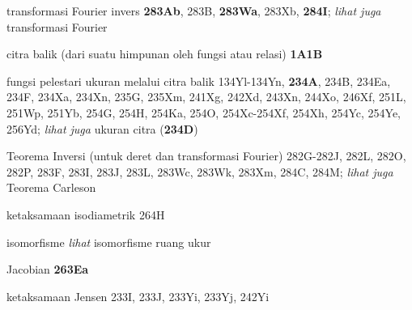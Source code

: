  




transformasi Fourier invers {\bf 283Ab}, 283B, {\bf 283Wa}, 283Xb,
{\bf 284I};
  {\it lihat juga} transformasi Fourier


citra balik (dari suatu himpunan oleh fungsi atau relasi) {\bf 1A1B}


fungsi pelestari ukuran melalui citra balik
134Yl-134Yn, 
  {\bf 234A}, 234B, 234Ea, 234F, 234Xa, 234Xn, 235G, 235Xm, 241Xg,
242Xd, 243Xn, 244Xo, 246Xf, 251L, 251Wp, 251Yb,
254G, 254H, 254Ka, 254O, 254Xc-254Xf, 
254Xh, 254Yc, 254Ye, 256Yd; 
  {\it lihat juga }
ukuran citra ({\bf 234D})




Teorema Inversi (untuk deret dan transformasi Fourier)
282G-282J, 
282L, 282O, 282P, 283F, 283I, 283J, 283L, 283Wc, 283Wk, 283Xm,
284C, 284M;
  {\it lihat juga} Teorema Carleson


















ketaksamaan isodiametrik 264H














isomorfisme {\it lihat} 
  isomorfisme ruang ukur










\indexmedskip

Jacobian {\bf 263Ea}











ketaksamaan Jensen 233I, 233J, 233Yi, 233Yj, 242Yi






